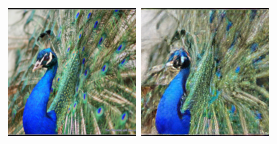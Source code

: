 \begin{figure}[h]
    \begin{minipage}{0.15\textwidth}
        \centering
        \includegraphics[width=\linewidth]{material/origin/66.png}
    \end{minipage}
    \begin{minipage}{0.15\textwidth}
        \centering
        \includegraphics[width=\linewidth]{material/vq/66.png}

\end{minipage}
\end{figure}
